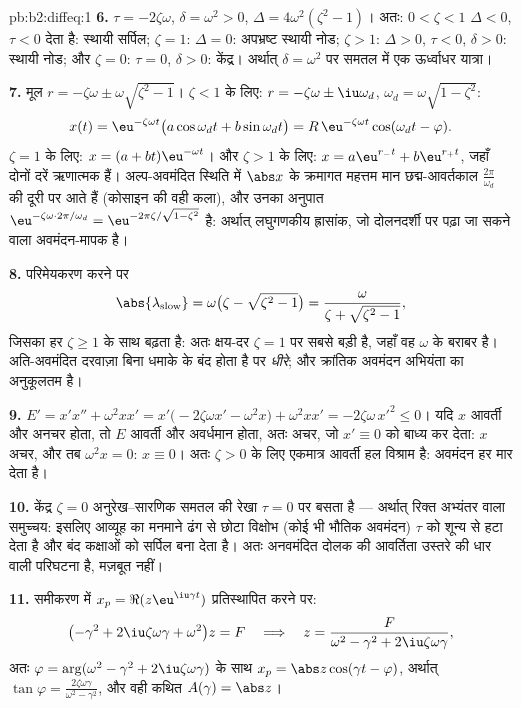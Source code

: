 \begin{solution}{pb:b2:diffeq:1}
\textbf{6.} $\tau = -2\zeta\omega$, $\delta = \omega^2 > 0$, $\Delta = 4\omega^2(\zeta^2 - 1)$। अतः: $0 < \zeta < 1$ $\Delta < 0$, $\tau < 0$ देता है: स्थायी सर्पिल;
$\zeta = 1$: $\Delta =
0$: अपभ्रष्ट स्थायी नोड; $\zeta > 1$: $\Delta > 0$, $\tau <
0$, $\delta > 0$: स्थायी नोड; और $\zeta = 0$:
$\tau = 0$, $\delta > 0$: केंद्र। अर्थात् $\delta = \omega^2$ पर समतल में एक ऊर्ध्वाधर यात्रा।

\textbf{7.} मूल $r = -\zeta\omega \pm
\omega\sqrt{\zeta^2-1}$। $\zeta < 1$ के लिए: $r = -\zeta\omega
\pm \iu\omega_d$, $\omega_d = \omega\sqrt{1-\zeta^2}$:
\[
x(t) = \eu^{-\zeta\omega t}\bigl(a\cos\omega_dt +
b\sin\omega_dt\bigr)
= R\,\eu^{-\zeta\omega t}\cos(\omega_dt - \varphi) .
\]
$\zeta = 1$ के लिए: $x = (a + bt)\eu^{-\omega t}$। और $\zeta >
1$ के लिए: $x = a\eu^{r_-t} + b\eu^{r_+t}$, जहाँ दोनों दरें ऋणात्मक हैं।
अल्प-अवमंदित स्थिति में $\abs x$ के क्रमागत महत्तम मान छद्म-आवर्तकाल $\frac{2\pi}{\omega_d}$ की
दूरी पर आते हैं (कोसाइन की वही कला), और उनका अनुपात $\eu^{-\zeta\omega\cdot2\pi/\omega_d} =
\eu^{-2\pi\zeta/\sqrt{1-\zeta^2}}$ है: अर्थात्
लघुगणकीय ह्रासांक, जो दोलनदर्शी पर पढ़ा जा सकने वाला अवमंदन-मापक है।

\textbf{8.} परिमेयकरण करने पर
\[
\abs{\lambda_{\mathrm{slow}}} = \omega\bigl(\zeta -
\sqrt{\zeta^2-1}\bigr)
= \frac{\omega}{\zeta + \sqrt{\zeta^2 - 1}} ,
\]
जिसका हर $\zeta \geq 1$ के साथ बढ़ता है: अतः क्षय-दर $\zeta = 1$ पर सबसे बड़ी है, जहाँ वह $\omega$
के बराबर है। अति-अवमंदित दरवाज़ा बिना धमाके के बंद होता है पर \emph{धीरे};
और क्रांतिक अवमंदन अभियंता का अनुकूलतम है।

\textbf{9.} $E' = x'x'' + \omega^2xx' =
x'\bigl(-2\zeta\omega x' - \omega^2x\bigr) + \omega^2xx' =
-2\zeta\omega\,x'^2 \leq 0$। यदि $x$ आवर्ती और अनचर होता, तो $E$ आवर्ती और अवर्धमान
होता, अतः अचर, जो $x' \equiv 0$ को बाध्य कर देता: $x$ अचर, और तब $\omega^2x = 0$: $x \equiv 0$। अतः $\zeta > 0$
के लिए एकमात्र आवर्ती हल विश्राम है: अवमंदन हर  मार देता है।

\textbf{10.} केंद्र $\zeta = 0$ अनुरेख--सारणिक समतल की रेखा $\tau =
0$ पर बसता है ---
अर्थात् रिक्त अभ्यंतर वाला समुच्चय: इसलिए आव्यूह का मनमाने ढंग से छोटा
विक्षोभ (कोई भी भौतिक अवमंदन) $\tau$ को शून्य से हटा देता है और बंद कक्षाओं
को सर्पिल बना देता है। अतः अनवमंदित दोलक की आवर्तिता उस्तरे की धार वाली
परिघटना है, मज़बूत नहीं।

\textbf{11.} समीकरण में $x_p = \Re(z\eu^{\iu\gamma t})$ प्रतिस्थापित करने पर:
\[
\bigl(-\gamma^2 + 2\iu\zeta\omega\gamma +
\omega^2\bigr)z = F
\quad\Longrightarrow\quad
z = \frac{F}{\omega^2 - \gamma^2 + 2\iu\zeta\omega\gamma},
\]
अतः $\varphi =
\arg(\omega^2 - \gamma^2 + 2\iu\zeta\omega\gamma)$ के साथ $x_p = \abs z\cos(\gamma t - \varphi)$, अर्थात् $\tan\varphi = \frac{2\zeta\omega\gamma}{\omega^2 -
\gamma^2}$, और वही कथित $A(\gamma) = \abs z$।


\end{solution}
